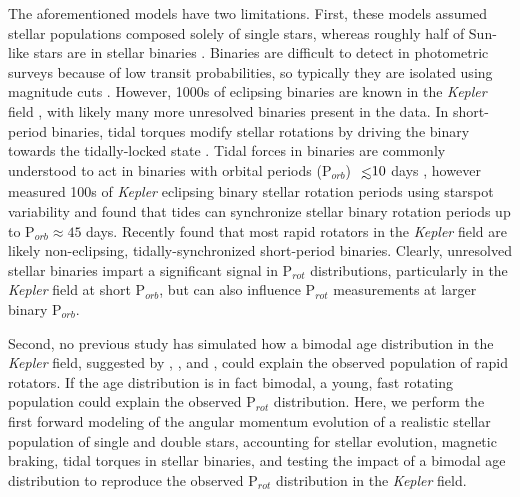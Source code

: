 \documentclass[twocolumn]{aastex61}
\def\lsim{~\rlap{$<$}{\lower 1.0ex\hbox{$\sim$}}}
\begin{document}
The aforementioned models have two limitations.  First, these models assumed stellar populations composed solely of single stars, whereas roughly half of Sun-like stars are in stellar binaries \citep{Raghavan2010,Duchene2013}. Binaries are difficult to detect in photometric surveys because of low transit probabilities, so typically they are isolated using magnitude cuts \citep[e.g.][]{Davenport2018,Simonian2018}. However, 1000s of eclipsing binaries are known in the \textit{Kepler} field \citep{Kirk2016}, with likely many more unresolved binaries present in the data. In short-period binaries, tidal torques modify stellar rotations by driving the binary towards the tidally-locked state \citep{Zahn1989,Fleming2018}. Tidal forces in binaries are commonly understood to act in binaries with orbital periods (P$_{orb}$) ${\lsim} 10$ days \citep[e.g.][]{Zahn1989,Meibom2005}, however \citet{Lurie2017} measured 100s of \textit{Kepler} eclipsing binary stellar rotation periods using starspot variability and found that tides can synchronize stellar binary rotation periods up to P$_{orb} \approx 45$ days.  Recently \citet{Simonian2018} found that most rapid rotators in the \textit{Kepler} field are likely non-eclipsing, tidally-synchronized short-period binaries. Clearly, unresolved stellar binaries impart a significant signal in P$_{rot}$ distributions, particularly in the \textit{Kepler} field at short P$_{orb}$, but can also influence P$_{rot}$ measurements at larger binary P$_{orb}$.  

Second, no previous study has simulated how a bimodal age distribution in the \textit{Kepler} field, suggested by \citet{McQuillan2014}, \citet{Matt2015}, and \citet{Davenport2017}, could explain the observed population of rapid rotators.  If the age distribution is in fact bimodal, a young, fast rotating population could explain the observed P$_{rot}$ distribution.  Here, we perform the first forward modeling of the angular momentum evolution of a realistic stellar population of single and double stars, accounting for stellar evolution, magnetic braking, tidal torques in stellar binaries, and testing the impact of a bimodal age distribution to reproduce the observed P$_{rot}$ distribution in the \textit{Kepler} field.

\end{document}
